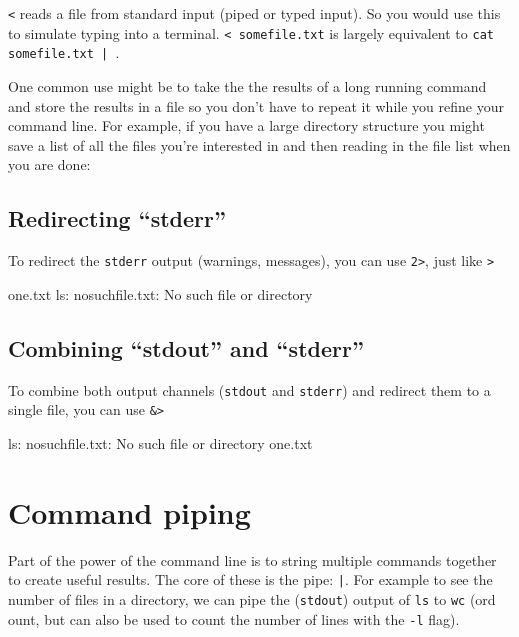 \verb|<| reads a file from standard input (piped or typed input).  So you would use
this to simulate typing into a terminal. \verb|< somefile.txt| is largely equivalent to
\verb=cat somefile.txt | =.

One common use might be to take the the results of a long running command and
store the results in a file so you don't have to repeat it while you refine your
command line. For example, if you have a large directory structure you might
save a list of all the files you're interested in and then reading in the file
list when you are done:

\begin{prompt}
\end{prompt}

\subsection{Redirecting ``stderr''}

To redirect the \verb|stderr| output (warnings, messages), you can use \verb|2>|, just
like \verb|>|

\begin{prompt}
one.txt
ls: nosuchfile.txt: No such file or directory
\end{prompt}

\subsection{Combining ``stdout'' and ``stderr''}

To combine both output channels (\verb|stdout| and \verb|stderr|) and redirect them to a single file, you can use
\verb|&>|

\begin{prompt}
ls: nosuchfile.txt: No such file or directory
one.txt
\end{prompt}

\section{Command piping}

Part of the power of the command line is to string multiple commands together to
create useful results. The core of these is the pipe: \verb=|=. For example to see
the number of files in a directory, we can pipe the (\verb|stdout|) output of
\verb|ls| to \verb|wc| (ord ount, but can also be used
to count the number of lines with the \verb|-l| flag).

